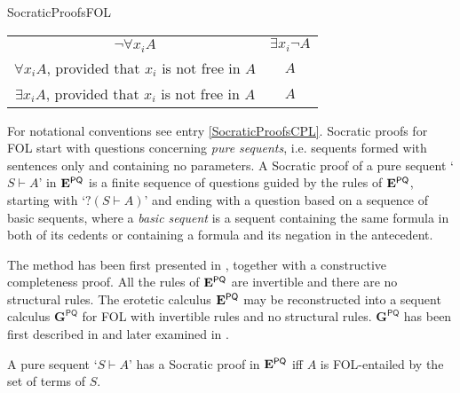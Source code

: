 \begin{entry}{SocraticProofsFOL}
\begin{calculus}
\begin{center}
\begin{tabular}{c|c}
$\neg\forall x_{i}A$ & $\exists x_{i}\neg A$ \\
			
$\forall x_{i}A$, provided that $x_{i}$ is not free in $A$ & $A$ \\
			
$\exists x_{i}A$, provided that $x_{i}$ is not free in $A$ & $A$ \\
	\end{tabular}

\end{center}
\end{calculus}

\begin{clarifications}
For notational conventions see entry \ref{SocraticProofsCPL}. Socratic proofs for FOL start with questions concerning \textit{pure sequents}, i.e. sequents formed with sentences only and containing no parameters. A Socratic proof of a pure sequent `$S \vdash A$' in $\mathbf{E}^\mathsf{PQ}$ is a finite sequence of questions guided by the rules of $\mathbf{E}^\mathsf{PQ}$, starting with `$? (S \vdash A)$' and ending with a question based on a sequence of basic sequents, where a \textit{basic sequent} is a sequent containing the same formula in both of its cedents or containing a formula and its negation in the antecedent.
\end{clarifications}

 \begin{history}
The method has been first presented in \cite{AW:2006SPQ}, together with a constructive completeness proof. All the rules of $\mathbf{E}^\mathsf{PQ}$ are invertible and there are no structural rules. The erotetic calculus $\mathbf{E}^\mathsf{PQ}$ may be reconstructed into a sequent calculus $\mathbf{G}^\mathsf{PQ}$ for FOL with invertible rules and no structural rules. $\mathbf{G}^\mathsf{PQ}$ has been first described in \cite{AW:2006SPQ} and later examined in \cite{LJUW:2013}.
\end{history}

\begin{technicalities}
A pure sequent `$S \vdash A$' has a Socratic proof in $\mathbf{E}^\mathsf{PQ}$ iff $A$ is FOL-entailed by the set of terms of $S$.
\end{technicalities}




\end{entry}
